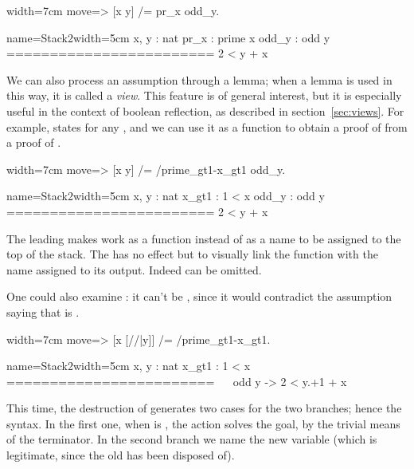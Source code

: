 \begin{coq-left}{}{width=7cm}
move=> [x y] /= pr_x odd_y.
$~$
$~$
$~$
$~$
\end{coq-left}
\begin{coqout-right}{name=Stack2}{width=5cm}
 x, y : nat
 pr_x : prime x
 odd_y : odd y
========================
 2 < y + x
\end{coqout-right}

We can also process an assumption through a lemma; when a lemma is
used in this way, it is called a \emph{view}. This feature is of
general interest, but it is especially useful in the context of boolean
reflection, as described in section~\ref{sec:views}. For example,
 states  for any , and we can
use it as a function to obtain a proof of   from a proof
of .


\begin{coq-left}{}{width=7cm}
move=> [x y] /= /prime_gt1-x_gt1 odd_y.
$~$
$~$
$~$
$~$
\end{coq-left}
\begin{coqout-right}{name=Stack2}{width=5cm}
 x, y : nat
 x_gt1 : 1 < x
 odd_y : odd y
========================
 2 < y + x
\end{coqout-right}

The leading \C{/} makes  work as a function instead of
as a name to be assigned to the top of the stack.  The \C{-} has no effect but
to visually link the function with the name  assigned to its output.
Indeed \C{-} can be omitted.

One could also examine : it can't be , since it would contradict
the assumption saying that  is .

\begin{coq-left}{}{width=7cm}
move=> [x [//|y]] /= /prime_gt1-x_gt1.
$~$
$~$
$~$
$~$
\end{coq-left}
\begin{coqout-right}{name=Stack2}{width=5cm}
 x, y : nat
 x_gt1 : 1 < x
 ========================
 ~~ odd y -> 2 < y.+1 + x
\end{coqout-right}

This time, the destruction of  generates two cases for the two
branches; hence the \C{[ .. | .. ]} syntax.  In the first one, when
 is ,
the \C{//} action solves the goal, by the trivial means
of the  terminator.  In the second branch we name  the
new variable (which is legitimate, since the old  has been
disposed of).

